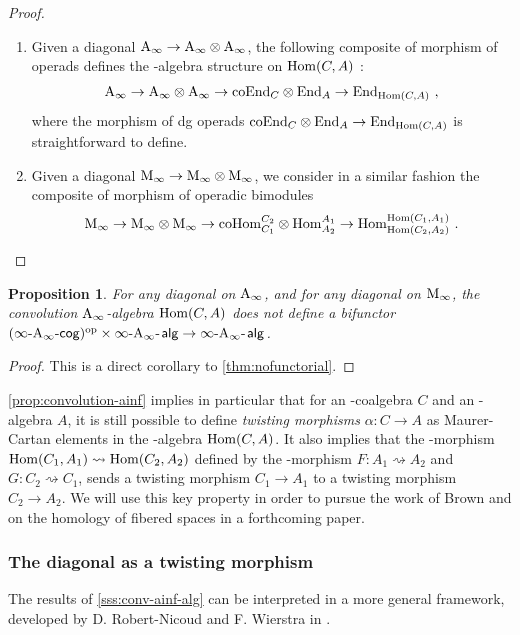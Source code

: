 \documentclass[twoside, 11pt]{amsart}
\newtheorem{proposition}[definition]{Proposition}
\theoremstyle{remark}
\begin{document}
\begin{proof} $ $
\begin{enumerate}[leftmargin=*]
\item Given a diagonal $\mathrm{A}_\infty \rightarrow \mathrm{A}_\infty \otimes \mathrm{A}_\infty$, the following composite of morphism of operads defines the \Ainf -algebra structure on $\mathrm{Hom}(C,A)$ : 
\[ \mathrm{A}_\infty \to \mathrm{A}_\infty \otimes \mathrm{A}_\infty \to \mathrm{coEnd}_C\otimes \mathrm{End}_A \to \mathrm{End}_{\mathrm{Hom}(C,A)} \ , \]
where the morphism of dg operads $\mathrm{coEnd}_C \otimes \mathrm{End}_A \to \mathrm{End}_{\mathrm{Hom}(C,A)}$ is straightforward to define.
\item Given a diagonal $\mathrm{M}_\infty \rightarrow \mathrm{M}_\infty \otimes \mathrm{M}_\infty$, we consider in a similar fashion the composite of morphism of operadic bimodules
\[ \mathrm{M}_\infty \to \mathrm{M}_\infty \otimes \mathrm{M}_\infty \to \mathrm{coHom}^{C_2}_{C_1} \otimes \mathrm{Hom}^{A_1}_{A_2} \to \mathrm{Hom}^{\mathrm{Hom}(C_1,A_1)}_{\mathrm{Hom}(C_2, A_2)} \ . \] 
\end{enumerate}
\end{proof}

\begin{proposition}
  \label{coroll:nobifunctor}
  For any diagonal on $\mathrm{A}_\infty$, and for any diagonal on $\mathrm{M}_\infty$, the convolution $\mathrm{A}_\infty$-algebra $\mathrm{Hom}(C,A)$ does not define a bifunctor $(\infty\text{-}\mathrm{A}_\infty\text{-}\mathsf{cog})^{\mathrm{op}} \times \infty\text{-}\mathrm{A}_\infty\text{-\hspace{1pt}}\mathsf{alg} \rightarrow \infty\text{-}\mathrm{A}_\infty\text{-\hspace{1pt}}\mathsf{alg}$.
\end{proposition}
\begin{proof}
  This is a direct corollary to \cref{thm:nofunctorial}.
\end{proof}

\cref{prop:convolution-ainf} implies in particular that for an \Ainf -coalgebra $C$ and an \Ainf -algebra $A$, it is still possible to define \textit{twisting morphisms} $\alpha : C \rightarrow A$ as Maurer-Cartan elements in the \Ainf -algebra $\mathrm{Hom} (C,A)$.
It also implies that the \Ainf -morphism $\mathrm{Hom} (C_1,A_1) \rightsquigarrow \mathrm{Hom} (C_2,A_2)$ defined by the \Ainf -morphism $F : A_1 \rightsquigarrow A_2$ and $G : C_2 \rightsquigarrow C_1$, sends a twisting morphism $C_1 \rightarrow A_1$ to a twisting morphism $C_2 \rightarrow A_2$.
We will use this key property in order to pursue the work of Brown \cite{Brown59} and \cite{Proute86} on the homology of fibered spaces in a forthcoming paper.

\subsubsection{The diagonal as a twisting morphism}

The results of \cref{sss:conv-ainf-alg} can be interpreted in a more general framework, developed by D. Robert-Nicoud and F. Wierstra in \cite{RobertNicoudWierstraI,RobertNicoudWierstraII}. 
\end{document}
